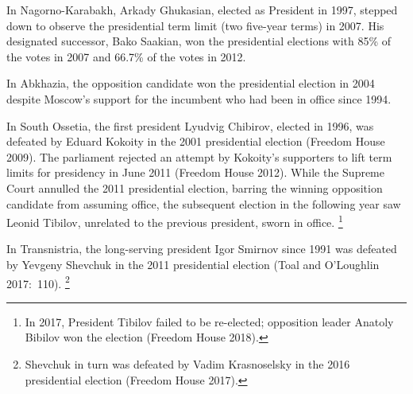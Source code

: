 \documentclass[12pt,a4paper]{article}%
\begin{document}
In Nagorno-Karabakh, Arkady Ghukasian, elected as President in 1997, stepped down to observe the presidential term limit (two five-year terms) in 2007. His designated successor, Bako Saakian, won the presidential elections with 85\% of the votes in 2007 and 66.7\% of the votes in 2012.

In Abkhazia, the opposition candidate won the presidential election in 2004 despite Moscow's support for the incumbent who had been in office since 1994. 

In South Ossetia, the first president Lyudvig Chibirov, elected in 1996, was defeated by Eduard Kokoity in the 2001 presidential election (Freedom House 2009).
The parliament rejected an attempt by Kokoity's supporters to lift term limits for presidency in June 2011 (Freedom House 2012).
While the Supreme Court annulled the 2011 presidential election, barring the winning opposition candidate from assuming office, the subsequent election in the following year saw Leonid Tibilov, unrelated to the previous president, sworn in office.%
\footnote{
	In 2017, President Tibilov failed to be re-elected; opposition leader Anatoly Bibilov won the election (Freedom House 2018).
} 

In Transnistria, the long-serving president Igor Smirnov since 1991 was defeated by Yevgeny Shevchuk in the 2011 presidential election (Toal and O'Loughlin 2017:\ 110).%
\footnote{
	Shevchuk in turn was defeated by Vadim Krasnoselsky in the 2016 presidential election (Freedom House 2017).
	}


\end{document}
